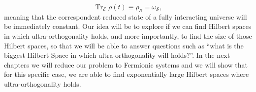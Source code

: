 \begin{equation}
\operatorname{Tr}_{\mathcal{E}}\rho(t)\equiv \rho_{\mathcal{S}} = \omega_{\mathcal{S}},
\end{equation}
meaning that the correspondent reduced state of a fully interacting universe will be immediately constant. Our idea will be to explore if we can find Hilbert spaces in which ultra-orthogonality holds, and more importantly, to find the size of those Hilbert spaces, so that we will be able to answer questions such as ``what is the biggest Hilbert Space in which ultra-orthogonality will holds?''. In the next chapters we will reduce our problem to Fermionic systems and we will show that for this specific case, we are able to find exponentially large Hilbert spaces where ultra-orthogonality holds.

